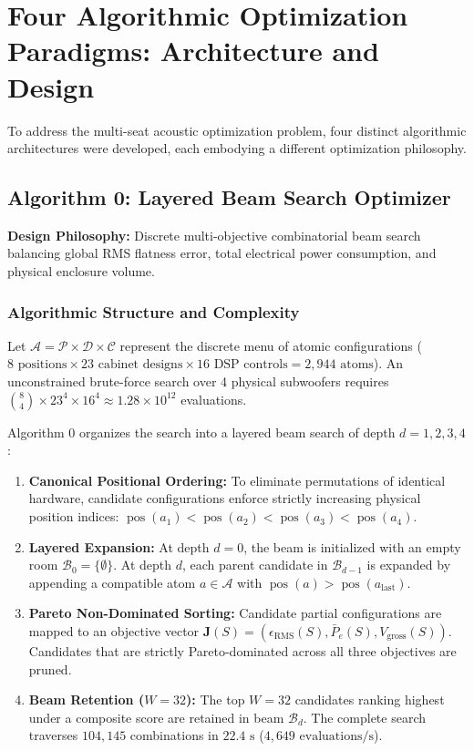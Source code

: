 \documentclass[11pt,a4paper,titlepage]{article}
\begin{document}
\newpage

\section{Four Algorithmic Optimization Paradigms: Architecture and Design}

To address the multi-seat acoustic optimization problem, four distinct algorithmic architectures were developed, each embodying a different optimization philosophy.

\subsection{Algorithm 0: Layered Beam Search Optimizer}
\textbf{Design Philosophy:} Discrete multi-objective combinatorial beam search balancing global RMS flatness error, total electrical power consumption, and physical enclosure volume.

\subsubsection{Algorithmic Structure and Complexity}
Let $\mathcal{A} = \mathcal{P} \times \mathcal{D} \times \mathcal{C}$ represent the discrete menu of atomic configurations ($8\text{ positions} \times 23\text{ cabinet designs} \times 16\text{ DSP controls} = 2,944\text{ atoms}$). An unconstrained brute-force search over 4 physical subwoofers requires $\binom{8}{4} \times 23^4 \times 16^4 \approx 1.28 \times 10^{12}$ evaluations. 

Algorithm 0 organizes the search into a layered beam search of depth $d = 1, 2, 3, 4$:
\begin{enumerate}
    \item \textbf{Canonical Positional Ordering:} To eliminate permutations of identical hardware, candidate configurations enforce strictly increasing physical position indices: $\operatorname{pos}(a_1) < \operatorname{pos}(a_2) < \operatorname{pos}(a_3) < \operatorname{pos}(a_4)$.
    \item \textbf{Layered Expansion:} At depth $d=0$, the beam is initialized with an empty room $\mathcal{B}_0 = \{\emptyset\}$. At depth $d$, each parent candidate in $\mathcal{B}_{d-1}$ is expanded by appending a compatible atom $a \in \mathcal{A}$ with $\operatorname{pos}(a) > \operatorname{pos}(a_{\text{last}})$.
    \item \textbf{Pareto Non-Dominated Sorting:} Candidate partial configurations are mapped to an objective vector $\mathbf{J}(S) = (\epsilon_{\text{RMS}}(S), \bar{P}_e(S), V_{\text{gross}}(S))$. Candidates that are strictly Pareto-dominated across all three objectives are pruned.
    \item \textbf{Beam Retention ($W = 32$):} The top $W = 32$ candidates ranking highest under a composite score are retained in beam $\mathcal{B}_d$. The complete search traverses $104,145$ combinations in $22.4\text{ s}$ ($4,649\text{ evaluations/s}$).
\end{enumerate}
\end{document}

